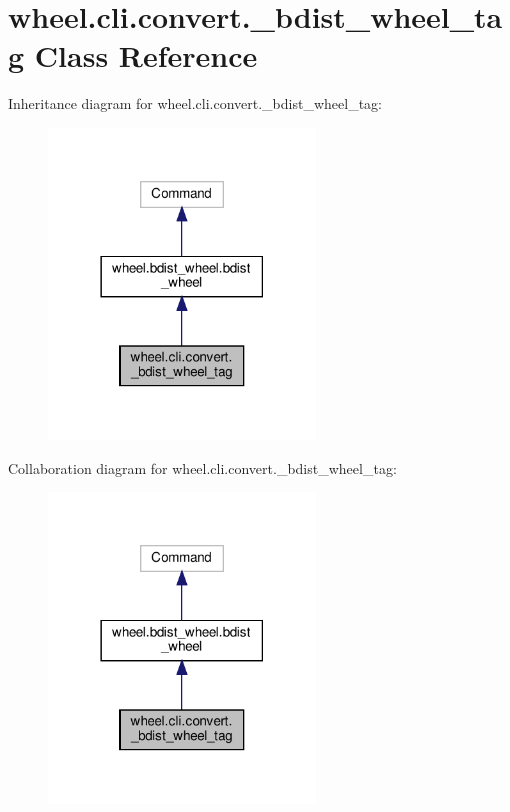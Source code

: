 \hypertarget{classwheel_1_1cli_1_1convert_1_1__bdist__wheel__tag}{}\section{wheel.\+cli.\+convert.\+\_\+bdist\+\_\+wheel\+\_\+tag Class Reference}
\label{classwheel_1_1cli_1_1convert_1_1__bdist__wheel__tag}


Inheritance diagram for wheel.\+cli.\+convert.\+\_\+bdist\+\_\+wheel\+\_\+tag\+:
\nopagebreak
\begin{figure}[H]
\begin{center}
\leavevmode
\includegraphics[width=201pt]{classwheel_1_1cli_1_1convert_1_1__bdist__wheel__tag__inherit__graph}
\end{center}
\end{figure}


Collaboration diagram for wheel.\+cli.\+convert.\+\_\+bdist\+\_\+wheel\+\_\+tag\+:
\nopagebreak
\begin{figure}[H]
\begin{center}
\leavevmode
\includegraphics[width=201pt]{classwheel_1_1cli_1_1convert_1_1__bdist__wheel__tag__coll__graph}
\end{center}
\end{figure}
